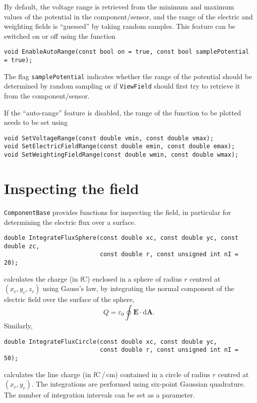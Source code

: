 By default, the voltage range is retrieved from the 
minimum and maximum values of the 
potential in the component/sensor, and
the range of the electric and weighting fields is
``guessed'' by taking random samples.
This feature can be switched on or off using the function
\begin{lstlisting}
void EnableAutoRange(const bool on = true, const bool samplePotential = true);
\end{lstlisting}
The flag \texttt{samplePotential} indicates whether the range of the 
potential should be determined by random sampling or if \texttt{ViewField}
should first try to retrieve it from the component/sensor. 

If the ``auto-range'' feature is disabled,
the range of the function to be plotted needs to be set using
\begin{lstlisting}
void SetVoltageRange(const double vmin, const double vmax);
void SetElectricFieldRange(const double emin, const double emax);
void SetWeightingFieldRange(const double wmin, const double wmax);
\end{lstlisting}

\section{Inspecting the field}
\texttt{ComponentBase} provides functions for inspecting the field, 
in particular for determining the electric flux over a surface.
\begin{lstlisting}
double IntegrateFluxSphere(const double xc, const double yc, const double zc,
                           const double r, const unsigned int nI = 20);
\end{lstlisting}
calculates the charge (in fC) enclosed in a sphere of radius $r$ centred at 
$\left(x_{c}, y_{c}, z_{c}\right)$ using Gauss's law, \ie by 
integrating the normal component of the electric field over the 
surface of the sphere, 
\begin{equation*}
  Q = \varepsilon_{0} \oint \mathbf{E}\cdot \text{d}\mathbf{A}.
\end{equation*}  
Similarly,
\begin{lstlisting}
double IntegrateFluxCircle(const double xc, const double yc, 
                           const double r, const unsigned int nI = 50);
\end{lstlisting}
calculates the line charge (in fC\,/\,cm) contained in a circle of radius $r$ 
centred at $\left(x_{c}, y_{c}\right)$.  
The integrations are performed using six-point Gaussian quadrature. 
The number of integration intervals can be set as a parameter. 

